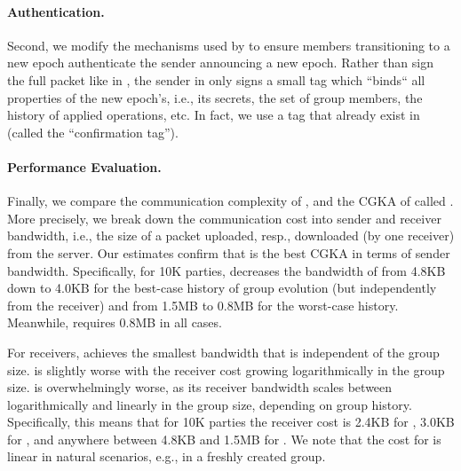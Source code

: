 \paragraph{Authentication.}
Second, we modify the mechanisms used by \protITK to ensure members
transitioning to a new epoch authenticate the sender announcing a new epoch.
Rather than sign the full packet like in \protITK, the sender in \saik only
signs a small tag which ``binds`` all properties of the new epoch's, i.e., its
secrets, the set of group members, the history of applied operations, etc.
In fact, we use a tag that already exist in \protITK (called the 
``confirmation tag'').

%


\paragraph{Performance Evaluation.}
Finally, we compare the communication complexity of \saik, \protITK and the CGKA of \cite{hashimoto2021cmpke} called \protCMPKE. More precisely, we break down the communication cost into sender and receiver bandwidth, i.e., the size of a packet uploaded, resp., downloaded (by one receiver) from the server.
%
Our estimates confirm that \saik is the best CGKA in terms of sender bandwidth. Specifically, for 10K parties, \saik decreases the bandwidth of \protITK from 4.8KB down to 4.0KB for the best-case history of group evolution (but independently from the receiver) and from 1.5MB to 0.8MB for the worst-case history. Meanwhile, \protCMPKE requires 0.8MB in all cases.

For receivers, \protCMPKE achieves the smallest bandwidth that is independent of the group size. \saik is slightly worse with the receiver cost growing logarithmically in the group size. \protITK is overwhelmingly worse, as its receiver bandwidth scales between logarithmically and linearly in the group size, depending on group history. Specifically, this means that for 10K parties the receiver cost is 2.4KB for \protCMPKE, 3.0KB for \saik, and anywhere between 4.8KB and 1.5MB for \protITK. We note that the cost for \protITK is linear in natural scenarios, e.g., in a freshly created group.


